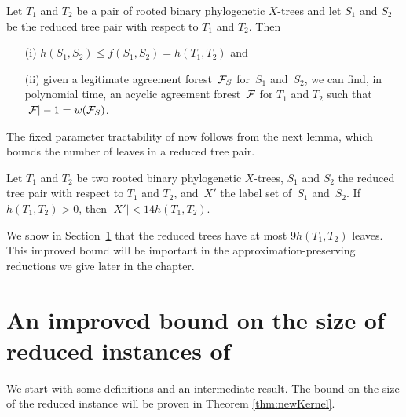 \begin{lemma}\label{l:preserving}\cite[Proposition 3.2]{bordewich07b}
Let $T_1$ and $T_2$ be a pair of rooted binary phylogenetic $X$-trees and let $S_1$ and $S_2$ be the reduced tree pair with respect to $T_1$ and $T_2$. Then
\begin{enumerate}
\item[(i)] $h(S_1,S_2) \leq f(S_1,S_2) = h(T_1,T_2)$ and
\item[(ii)] given a legitimate agreement forest~${\mathcal F}_S$ for~$S_1$ and~$S_2$, we can find, in polynomial time, an acyclic agreement forest~${\mathcal F}$ for $T_1$ and $T_2$ such that $|{\mathcal F}| - 1 = w({\mathcal F}_S)$.
\end{enumerate}
\end{lemma}

The fixed parameter tractability of \mh now follows from the next lemma, which bounds the number of leaves in a reduced tree pair.

\begin{lemma}\cite[Lemma 3.3]{bordewich07b}\label{l:oldFPTfactor}
Let $T_1$ and $T_2$ be two rooted binary phylogenetic $X$-trees, $S_1$ and $S_2$ the reduced tree pair with respect to $T_1$ and $T_2$, and~$X'$ the label set of~$S_1$ and~$S_2$. If $h(T_1,T_2)>0$, then $|X'|<14h(T_1,T_2)$.
\end{lemma}

\noindent We show in Section~\ref{sec:kernel} that the reduced trees have at most $9h(T_1,T_2)$ leaves. This improved bound will be important in the approximation-preserving reductions we give later in the chapter.






\section{An improved bound on the size of reduced instances of \mh}\label{sec:kernel}

We start with some definitions and an intermediate result. The bound on the size of the reduced instance will be proven in Theorem \ref{thm:newKernel}.

